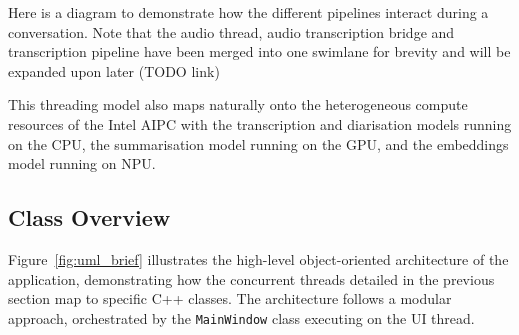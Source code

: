Here is a diagram to demonstrate how the different pipelines interact during a conversation. Note that the audio thread, audio transcription bridge and transcription pipeline have been merged into one swimlane for brevity and will be expanded upon later (TODO link)



This threading model also maps naturally onto the heterogeneous compute resources of the Intel AIPC with the transcription and diarisation models running on the CPU, the summarisation model running on the GPU, and the embeddings model running on NPU.

\subsection{Class Overview}
Figure~\ref{fig:uml_brief} illustrates the high-level object-oriented architecture of the application, demonstrating how the concurrent threads detailed in the previous section map to specific C++ classes. The architecture follows a modular approach, orchestrated by the \texttt{MainWindow} class executing on the UI thread. 


